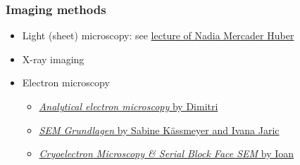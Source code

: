 \begin{frame}
	\frametitle{Imaging methods}
	\begin{itemize}
		\item Light (sheet) microscopy: see \href{https://ilias.unibe.ch/goto_ilias3_unibe_sess_2177945.html}{lecture of Nadia Mercader Huber}
		\item X-ray imaging
		\item Electron microscopy
		\begin{itemize}
			\item \href{https://moodle.bfh.ch/course/section.php?id=546756}{\emph{Analytical electron microscopy} by Dimitri}
			\item \href{https://ilias.unibe.ch/goto_ilias3_unibe_sess_2177954.html}{\emph{SEM Grundlagen} by Sabine Kässmeyer and Ivana Jaric}
			\item \href{https://ilias.unibe.ch/goto_ilias3_unibe_sess_2177956.html}{\emph{Cryoelectron Microscopy \& Serial Block Face SEM} by Ioan}
		\end{itemize}
	\end{itemize}
\end{frame}

